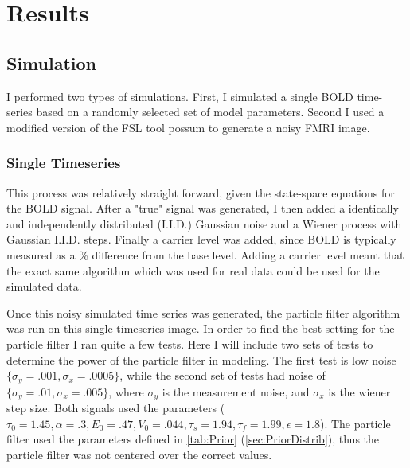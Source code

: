 \chapter{Results}

\section{Simulation}
I performed two types of simulations. First, I simulated a single BOLD time-series based
on a randomly selected set of model parameters. Second I used a modified version of the
FSL tool possum to generate a noisy FMRI image. 

\subsection{Single Timeseries}
This process was relatively straight forward,
given the state-space equations for the BOLD signal. After a "true" signal was generated,
I then added a identically and independently distributed (I.I.D.) Gaussian noise and a Wiener
process with Gaussian I.I.D. steps. Finally a carrier level was added, since BOLD is typically
measured as a \% difference from the
base level. Adding a carrier level meant that the exact same algorithm which was used for 
real data could be used for the simulated data. 

Once this noisy simulated time series was generated, the particle filter algorithm
 was run on this single timeseries image. In order to find the best setting for the
particle filter I ran quite a few tests. Here I will include two sets of tests 
to determine the power of the particle filter in modeling. The first test is
low noise $\{\sigma_y = .001, \sigma_x = .0005\}$, while the second set of
tests had noise of $ \{\sigma_y = .01, \sigma_x = .005\} $, where $\sigma_y$ is the
measurement noise, and $\sigma_x$ is the wiener step size. Both signals used the
parameters ($\tau_0 = 1.45, \alpha = .3, E_0 = .47, V_0 = .044, \tau_s = 1.94, \tau_f = 1.99, \epsilon = 1.8$).
The particle filter used the parameters defined in \autoref{tab:Prior} (\autoref{sec:PriorDistrib}),
thus the particle filter was not centered over the correct values. 

